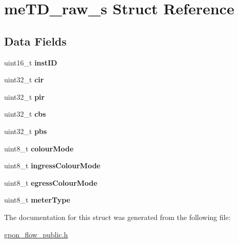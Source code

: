 \hypertarget{structmeTD__raw__s}{}\section{me\+T\+D\+\_\+raw\+\_\+s Struct Reference}
\label{structmeTD__raw__s}
\subsection*{Data Fields}
\begin{DoxyCompactItemize}
\item 
\mbox{\label{structmeTD__raw__s_acee3f3dc40175a6f3ff2bf3fac0da649}} 
uint16\+\_\+t {\bfseries inst\+ID}
\item 
\mbox{\label{structmeTD__raw__s_a454474db65d4abffbfb75759e73e7d13}} 
uint32\+\_\+t {\bfseries cir}
\item 
\mbox{\label{structmeTD__raw__s_af157f82db058711469ac4d53772cfd17}} 
uint32\+\_\+t {\bfseries pir}
\item 
\mbox{\label{structmeTD__raw__s_a4bf2938538d7d0f46ccfb80cc64ecfc8}} 
uint32\+\_\+t {\bfseries cbs}
\item 
\mbox{\label{structmeTD__raw__s_ad8cb221acc14a4b7645d26d412ea8568}} 
uint32\+\_\+t {\bfseries pbs}
\item 
\mbox{\label{structmeTD__raw__s_a70e4024b0125885047b8ec31b84ee084}} 
uint8\+\_\+t {\bfseries colour\+Mode}
\item 
\mbox{\label{structmeTD__raw__s_a1ac25f3800b6598a58cb324db1ac7af8}} 
uint8\+\_\+t {\bfseries ingress\+Colour\+Mode}
\item 
\mbox{\label{structmeTD__raw__s_af88aef6a9d41233b1dba91f59c0dab97}} 
uint8\+\_\+t {\bfseries egress\+Colour\+Mode}
\item 
\mbox{\label{structmeTD__raw__s_ae54c0244405d14c4e1637afe6aa3e771}} 
uint8\+\_\+t {\bfseries meter\+Type}
\end{DoxyCompactItemize}


The documentation for this struct was generated from the following file\+:\begin{DoxyCompactItemize}
\item 
\hyperlink{gpon__flow__public_8h}{gpon\+\_\+flow\+\_\+public.\+h}\end{DoxyCompactItemize}
